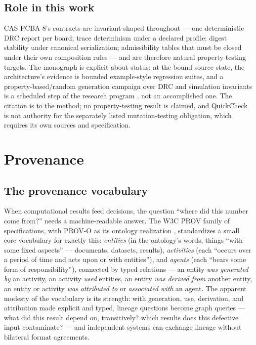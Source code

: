\subsection{Role in this work}\label{ch02:pbt:role}

CAS PCBA 8's contracts are invariant-shaped throughout --- one
deterministic DRC report per board; trace determinism under a declared
profile; digest stability under canonical serialization; admissibility
tables that must be closed under their own composition rules --- and are
therefore natural property-testing targets. The monograph is explicit
about status: at the bound source state, the architecture's evidence is
bounded example-style regression suites, and a property-based/random
generation campaign over DRC and simulation invariants is a scheduled
step of the research program \cite{quickcheck}, not an accomplished one.
The citation is to the method; no property-testing result is claimed,
and QuickCheck is not authority for the separately listed
mutation-testing obligation, which requires its own sources and
specification.

\section{Provenance}\label{ch02:prov}

\subsection{The provenance vocabulary}\label{ch02:prov:vocab}

When computational results feed decisions, the question ``where did this
number come from?'' needs a machine-readable answer. The W3C PROV family
of specifications, with PROV-O as its ontology realization \cite{prov},
standardizes a small core vocabulary for exactly this: \emph{entities}
(in the ontology's words, things ``with some fixed aspects'' ---
documents, datasets, results), \emph{activities} (each ``occurs over a
period of time and acts upon or with entities''), and \emph{agents} (each
``bears some form of responsibility''), connected by typed
relations --- an entity \emph{was generated by} an activity, an activity
\emph{used} entities, an entity \emph{was derived from} another entity,
an entity or activity \emph{was attributed to} or \emph{associated with}
an agent. The apparent modesty of the vocabulary is its strength: with
generation, use, derivation, and attribution made explicit and typed,
lineage questions become graph queries --- what did this result depend
on, transitively? which results does this defective input contaminate?
--- and independent systems can exchange lineage without bilateral
format agreements.

